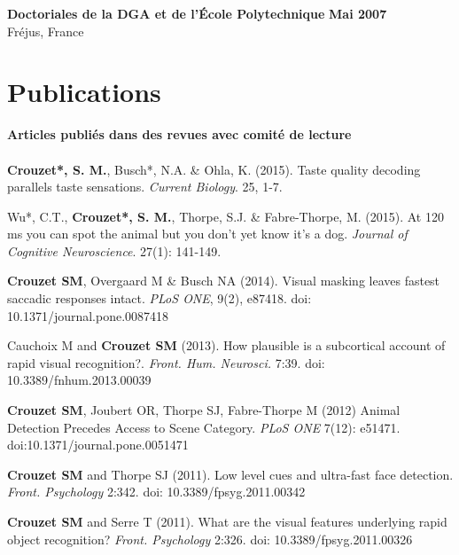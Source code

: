 \documentclass[margin,line]{resume}
\begin{document}
\begin{resume}
	\textbf{Doctoriales de la DGA et de l'École Polytechnique} \hfill \textbf{Mai 2007}\\
	Fréjus, France
	\vspace{-1.5mm}


\vspace{3mm}	
\section{\mysidestyle Publications}

\textbf{Articles publiés dans des revues avec comité de lecture}\\\\
	\textbf{Crouzet*, S. M.}, Busch*, N.A. \& Ohla, K. (2015). Taste quality decoding parallels taste sensations. \textit{Current Biology}. 25, 1-7.

	\vspace{-2mm} Wu*, C.T.,  \textbf{Crouzet*, S. M.}, Thorpe, S.J. \& Fabre-Thorpe, M. (2015). At 120 ms you can spot the animal but you don't yet know it's a dog. \textit{Journal of Cognitive Neuroscience}. 27(1): 141-149.

\newpage

  	\vspace{-2mm} \textbf{Crouzet SM}, Overgaard M \& Busch NA (2014). Visual masking leaves fastest saccadic responses intact. \textit{PLoS ONE}, 9(2), e87418. doi: 10.1371/journal.pone.0087418

	\vspace{-2mm} Cauchoix M and \textbf{Crouzet SM} (2013). How plausible is a subcortical account of rapid visual recognition?. \textit{Front. Hum. Neurosci.} 7:39. doi: 10.3389/fnhum.2013.00039
	
	\vspace{-2mm} \textbf{Crouzet SM}, Joubert OR, Thorpe SJ, Fabre-Thorpe M (2012) Animal Detection Precedes Access to Scene Category. \textit{PLoS ONE} 7(12): e51471. doi:10.1371/journal.pone.0051471



	\vspace{-2mm} \textbf{Crouzet SM} and Thorpe SJ (2011). Low level cues and ultra-fast face detection. \textit{Front. Psychology} 2:342. doi: 10.3389/fpsyg.2011.00342

	\vspace{-2mm} \textbf{Crouzet SM} and Serre T (2011). What are the visual features underlying rapid object recognition? \textit{Front. Psychology} 2:326. doi: 10.3389/fpsyg.2011.00326


\end{resume}
\end{document}
